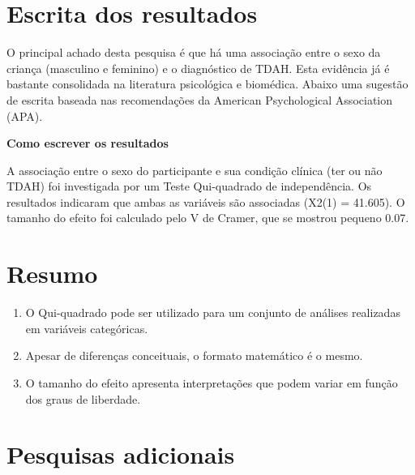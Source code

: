 \documentclass[
]{book}
\providecommand{\tightlist}{%
  \setlength{\itemsep}{0pt}\setlength{\parskip}{0pt}}
\begin{document}
\hypertarget{escrita-dos-resultados}{%
\section{Escrita dos resultados}\label{escrita-dos-resultados}}

O principal achado desta pesquisa é que há uma associação entre o sexo da criança (masculino e feminino) e o diagnóstico de TDAH. Esta evidência já é bastante consolidada na literatura psicológica e biomédica. Abaixo uma sugestão de escrita baseada nas recomendações da American Psychological Association (APA).

\begin{writing}
\textbf{Como escrever os resultados}

A associação entre o sexo do participante e sua condição clínica (ter ou
não TDAH) foi investigada por um Teste Qui-quadrado de independência. Os
resultados indicaram que ambas as variáveis são associadas (X2(1) =
41.605). O tamanho do efeito foi calculado pelo V de Cramer, que se
mostrou pequeno 0.07.
\end{writing}

\hypertarget{resumo-4}{%
\section{Resumo}\label{resumo-4}}

\begin{explore}

\begin{enumerate}
\def\labelenumi{\arabic{enumi}.}
\tightlist
\item
  O Qui-quadrado pode ser utilizado para um conjunto de análises realizadas em variáveis categóricas.\\
\item
  Apesar de diferenças conceituais, o formato matemático é o mesmo.\\
\item
  O tamanho do efeito apresenta interpretações que podem variar em função dos graus de liberdade.\\
\end{enumerate}

\end{explore}

\hypertarget{pesquisas-adicionais-1}{%
\section{Pesquisas adicionais}\label{pesquisas-adicionais-1}}
\end{document}
